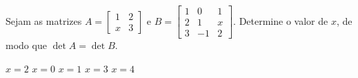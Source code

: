 Sejam as matrizes $A = \left[ \begin{array}{cc}
1 & 2 \\
x & 3
\end{array} \right]$ e $B = \left[ \begin{array}{ccc}
1 & 0 & 1 \\
2 & 1 & x \\
3 & -1 & 2
\end{array} \right]$. Determine o valor de $x$, de modo que $\det A=\det B$.

$x=2$
$x=0$
$x=1$
$x=3$
$x=4$


